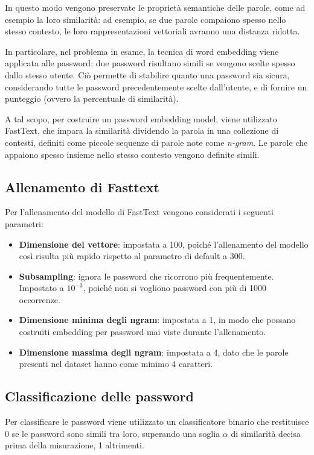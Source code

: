 In questo modo vengono preservate le proprietà semantiche delle parole, come ad esempio la loro similarità: ad esempio, se due parole compaiono spesso nello stesso contesto, le loro rappresentazioni vettoriali avranno una distanza ridotta.

In particolare, nel problema in esame, la tecnica di word embedding viene applicata alle password: due password risultano simili se vengono scelte spesso dallo stesso utente. Ciò permette di stabilire quanto una password sia sicura, considerando tutte le password precedentemente scelte dall'utente, e di fornire un punteggio (ovvero la percentuale di similarità).

A tal scopo, per costruire un password embedding model, viene utilizzato FastText, che impara la similarità dividendo la parola in una collezione di contesti, definiti come piccole sequenze di parole note come \emph{n-gram}. Le parole che appaiono spesso insieme nello stesso contesto vengono definite simili.

\subsection{Allenamento di Fasttext}
\label{sec:allenamento fasttext}
Per l'allenamento del modello di FastText vengono considerati i seguenti parametri:

\begin{itemize}
    \item \textbf{Dimensione del vettore}: impostata a 100, poiché l'allenamento del modello così risulta più rapido rispetto al parametro di default a 300.
    \item \textbf{Subsampling}: ignora le password che ricorrono più frequentemente. Impostato a $10^{-3}$, poiché non si vogliono password con più di 1000 occorrenze.
    \item \textbf{Dimensione minima degli ngram}: impostata a 1, in modo che possano costruiti embedding per password mai viste durante l'allenamento.
    \item \textbf{Dimensione massima degli ngram}: impostata a 4, dato che le parole presenti nel dataset hanno come minimo 4 caratteri.
\end{itemize}
\subsection{Classificazione delle password}
\label{sec:classificazione password}
Per classificare le password viene utilizzato un classificatore binario che restituisce 0 se le password sono simili tra loro, superando una soglia $\alpha$ di similarità decisa prima della misurazione, 1 altrimenti.

